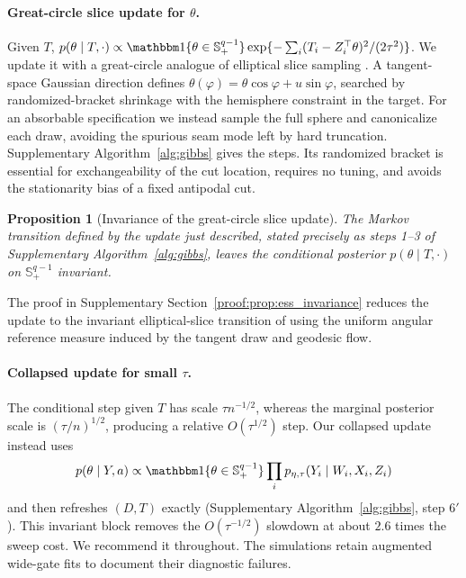 \documentclass[11pt]{article}
\newtheorem{proposition}{Proposition}
\theoremstyle{definition}
\theoremstyle{plain}
\begin{document}
\paragraph{Great-circle slice update for $\theta$.}
Given $T$, $p(\theta\mid T,\cdot)\propto\mathbbm 1\{\theta\in\mathbb S^{q-1}_+\}\exp\{-\sum_i(T_i-Z_i^\top\theta)^2/(2\tau^2)\}$. We update it with a great-circle analogue of elliptical slice sampling \citep{Murray2010,Neal2003}. A tangent-space Gaussian direction defines $\theta(\varphi)=\theta\cos\varphi+u\sin\varphi$, searched by randomized-bracket shrinkage with the hemisphere constraint in the target. For an absorbable specification we instead sample the full sphere and canonicalize each draw, avoiding the spurious seam mode left by hard truncation. Supplementary Algorithm~\ref{alg:gibbs} gives the steps. Its randomized bracket is essential for exchangeability of the cut location, requires no tuning, and avoids the stationarity bias of a fixed antipodal cut.

\begin{proposition}[Invariance of the great-circle slice update]\label{prop:ess_invariance}
The Markov transition defined by the update just described, stated precisely as steps 1--3 of Supplementary Algorithm~\ref{alg:gibbs}, leaves the conditional posterior $p(\theta\mid T,\cdot)$ on $\mathbb S^{q-1}_+$ invariant.
\end{proposition}

The proof in Supplementary Section~\ref{proof:prop:ess_invariance} reduces the update to the invariant elliptical-slice transition of \citet{Murray2010} using the uniform angular reference measure induced by the tangent draw and geodesic flow.

\paragraph{Collapsed update for small $\tau$.}
The conditional step given $T$ has scale $\tau n^{-1/2}$, whereas the marginal posterior scale is $(\tau/n)^{1/2}$, producing a relative $O(\tau^{1/2})$ step. Our collapsed update instead uses
\[
p(\theta\mid Y,a)\propto\mathbbm 1\{\theta\in\mathbb S^{q-1}_+\}\prod_i p_{\eta,\tau}(Y_i\mid W_i,X_i,Z_i)
\]
and then refreshes $(D,T)$ exactly (Supplementary Algorithm~\ref{alg:gibbs}, step 6$'$). This invariant block removes the $O(\tau^{-1/2})$ slowdown at about $2.6$ times the sweep cost. We recommend it throughout. The simulations retain augmented wide-gate fits to document their diagnostic failures.
\end{document}
